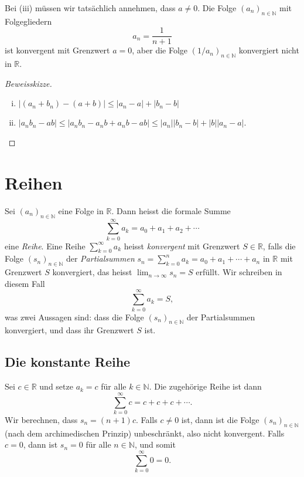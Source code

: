\documentclass[../main.tex]{subfiles}
\begin{document}
\begin{remark}
Bei (iii) müssen wir tatsächlich annehmen,
dass $a \neq 0$. Die Folge ${(a_n)}_{n \in \mathbb{N}}$ 
mit Folgegliedern
\[
  a_n = \frac{1}{n+1}
\]
ist konvergent mit Grenzwert $a = 0$, aber die Folge
${(1/a_n)}_{n \in \mathbb{N}}$ konvergiert nicht in $\mathbb{R}$.
\end{remark}

\begin{proof}[Beweisskizze]
  \leavevmode
  \begin{enumerate}[(i)]
    \item $|(a_n + b_n) - (a + b)| \leq |a_n - a| + |b_n - b|$
    \item $|a_n b_n - ab| \leq 
      {|a_n b_n - a_n b + a_n b - ab |}
      \leq |a_n| |b_n - b| + |b||a_n -a|$. \qedhere
  \end{enumerate}
\end{proof}


\section{Reihen}
\begin{definition}
  Sei ${(a_{n})}_{n \in \mathbb{N}}$ eine Folge in $\mathbb{R}$.
  Dann heisst die formale Summe
  \[
    \sum_{k=0}^{\infty} a_k = a_0 + a_1 + a_2 + \cdots
  \]
  eine \emph{Reihe}. Eine Reihe
  $
    \sum_{k=0}^{\infty} a_k
  $
  heisst \emph{konvergent} mit Grenzwert $S \in \mathbb{R}$,
  falls die Folge ${(s_{n})}_{n \in \mathbb{N}}$ der
  \emph{Partialsummen}
  \(
    s_n = \sum_{k=0}^{n} a_k = a_0 + a_1 + \cdots + a_n
  \)
  in $\mathbb{R}$ mit Grenzwert $S$ konvergiert, das heisst
  \(
    \lim_{n \to \infty} s_n = S
  \)
  erfüllt. Wir schreiben in diesem Fall
  \[
    \sum_{k=0}^{\infty} a_k = S,
  \]
  was zwei Aussagen sind: dass die Folge ${(s_{n})}_{n \in \mathbb{N}}$ der Partialsummen konvergiert, und dass
  ihr Grenzwert $S$ ist.
\end{definition}

\subsection*{Die konstante Reihe}
Sei $c \in \mathbb{R}$ und setze $a_k = c$ für alle 
$k \in \mathbb{N}$.
Die zugehörige Reihe ist dann
 \[
  \sum_{k=0}^{\infty} c = c + c + c + \cdots.
\]
Wir berechnen, dass $s_n = (n+1)c$.
Falls $c \neq 0$ ist, dann ist die Folge
${(s_{n})}_{n \in \mathbb{N}}$ (nach dem
archimedischen Prinzip) unbeschränkt,
also nicht konvergent. Falls $c = 0$,
dann ist $s_n = 0$ für alle $n \in \mathbb{N}$,
und somit
\[
  \sum_{k=0}^{\infty} 0 = 0.
\]
\end{document}
